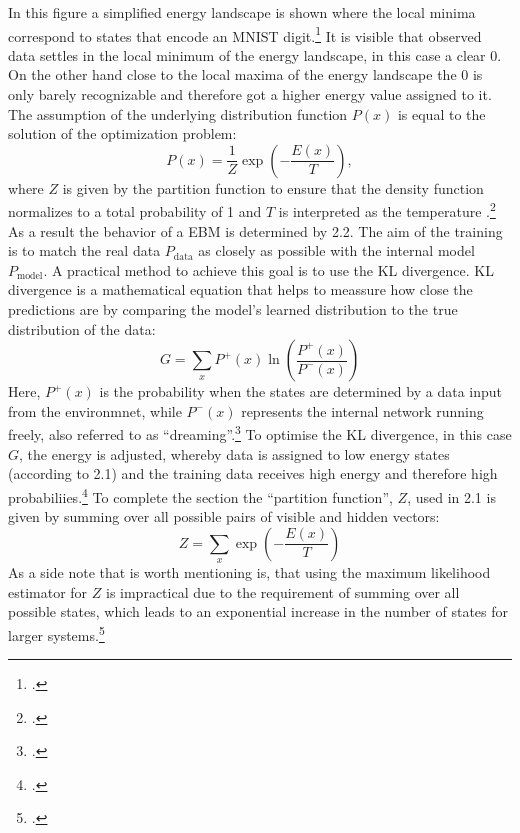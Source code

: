 In this figure a simplified energy landscape is shown where the local minima correspond to states that encode an MNIST digit.\footcite[Vgl.][6]{huembeliPhysicsEnergybasedModels2022} It is visible that observed data settles in the local minimum of the energy landscape, in this case a clear 0. On the other hand close to the local maxima of the energy landscape the 0 is only barely recognizable and therefore got a higher energy value assigned to it.
The assumption of the underlying distribution function \( P(x) \)  is equal to the solution of the optimization problem:
\begin{equation}
    P(x) = \frac{1}{Z} \exp\left(-\frac{E(x)}{T}\right),
\end{equation}
where \( Z \) is given by the partition function to ensure
that the density function normalizes to a total probability of 1 and \( T \) is interpreted as the temperature .\footcite[Vgl.][2-3]{huembeliPhysicsEnergybasedModels2022}
As a result the behavior of a \ac{EBM} is determined by 2.2. 
The aim of the training is to match the real data \( P_{\text{data}} \) as closely as possible with the internal model \( P_{\text{model}} \).
A practical method to achieve this goal is to use the KL divergence. KL divergence is a mathematical equation that helps to meassure how close the predictions are by comparing the model's learned distribution to the true distribution of the data:
\begin{equation}
    G = \sum_x P^+(x) \ln \left( \frac{P^+(x)}{P^-(x)} \right)
\end{equation}
Here, \(P^+(x)\) is the probability when the states are determined by a data input from the environmnet, while \(P^-(x)\) represents the internal network running freely, also referred to as ``dreaming''.\footcite[Vgl.][154-155]{ackleyLearningAlgorithmBoltzmann1985}
To optimise the KL divergence, in this case \( G \), the energy is adjusted, whereby data is assigned to low energy states (according to 2.1) and the training data receives high energy and therefore high probabiliies.\footcite[Vgl.][2-3]{zhaiDeepStructuredEnergy2016}
To complete the section the ``partition function'', \( Z \), used in 2.1 is given by summing over all possible pairs of visible and hidden vectors:
\begin{equation}
    Z = \sum_x \exp\left(-\frac{E(x)}{T}\right)
\end{equation}
As a side note that is worth mentioning is, that using the maximum likelihood estimator for \( Z \) is impractical due to the requirement of summing over all possible states, which leads to an exponential increase in the number of states for larger systems.\footcite[Vgl.][2-3]{zhaiDeepStructuredEnergy2016}

